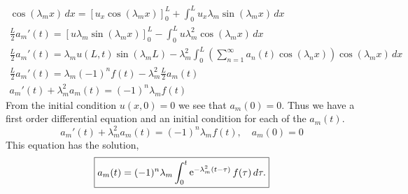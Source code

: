 {\begin{Solution}
\begin{gather*}
    \cos( \lambda_m x ) \,d x 
    = \left[ u_x \cos( \lambda_m x ) \right]_0^L
    + \int_0^L u_x \lambda_m \sin( \lambda_m x ) \,d x \\
    \frac{L}{2} a_m'(t) 
    = \left[ u \lambda_m \sin( \lambda_m x ) \right]_0^L
    - \int_0^L u \lambda_m^2 \cos( \lambda_m x ) \,d x \\
    \frac{L}{2} a_m'(t) 
    = \lambda_m u(L,t) \sin( \lambda_m L ) 
    - \lambda_m^2 \int_0^L 
    \left( \sum_{n = 1}^\infty a_n(t) \cos( \lambda_n x ) \right)
    \cos( \lambda_m x ) \,d x \\
    \frac{L}{2} a_m'(t) 
    = \lambda_m (-1)^n f(t) - \lambda_m^2 \frac{L}{2} a_m(t) \\
    a_m'(t) + \lambda_m^2 a_m(t) = (-1)^n \lambda_m f(t) 
  \end{gather*}
  From the initial condition $u(x,0) = 0$ we see that $a_m(0) = 0$.  Thus 
  we have a first order differential equation and an initial condition for
  each of the $a_m(t)$.
  \[
  a_m'(t) + \lambda_m^2 a_m(t) = (-1)^n \lambda_m f(t), \quad a_m(0) = 0
  \]
  This equation has the solution,
  \[
  \boxed{
    a_m(t) = (-1)^n \lambda_m \int_0^t \mathop{\mathrm{e}}\nolimits^{-\lambda_m^2 (t - \tau)} f(\tau)\,d\tau.
    }
  \]
\end{Solution}








}
